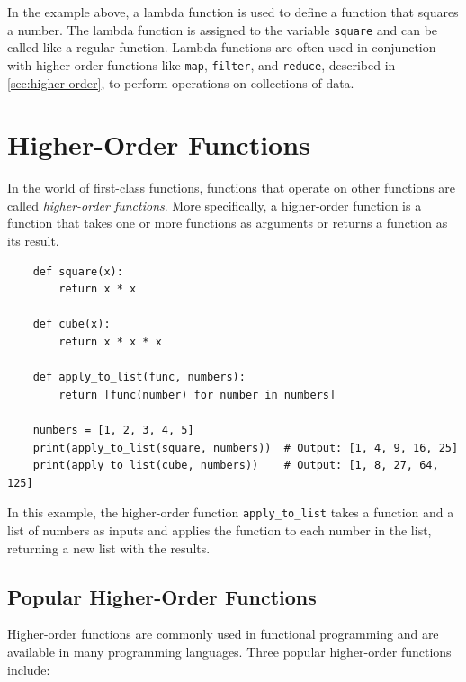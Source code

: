 \documentclass[oneside,11pt,dvipsnames]{book}
\newcommand{\code}[1]{\texttt{#1}}
\begin{document}
In the example above, a lambda function is used to define a function that squares a number. The lambda function is assigned to the variable \code{square} and can be called like a regular function.
Lambda functions are often used in conjunction with higher-order functions like \code{map}, \code{filter}, and \code{reduce}, described in \autoref{sec:higher-order}, to perform operations on collections of data.

\section{Higher-Order Functions}\label{sec:higher-order}

In the world of first-class functions, functions that operate on other functions are called \emph{higher-order functions}. More specifically, a higher-order function is a function that takes one or more functions as arguments or returns a function as its result.

\begin{lstlisting}
    def square(x):
        return x * x

    def cube(x):
        return x * x * x

    def apply_to_list(func, numbers):
        return [func(number) for number in numbers]

    numbers = [1, 2, 3, 4, 5]
    print(apply_to_list(square, numbers))  # Output: [1, 4, 9, 16, 25]
    print(apply_to_list(cube, numbers))    # Output: [1, 8, 27, 64, 125]

\end{lstlisting}

In this example, the higher-order function \code{apply\_to\_list} takes a function and a list of numbers as inputs and applies the function to each number in the list, returning a new list with the results. 


\subsection{Popular Higher-Order Functions}

Higher-order functions are commonly used in functional programming and are available in many programming languages. Three popular higher-order functions include:
\end{document}
